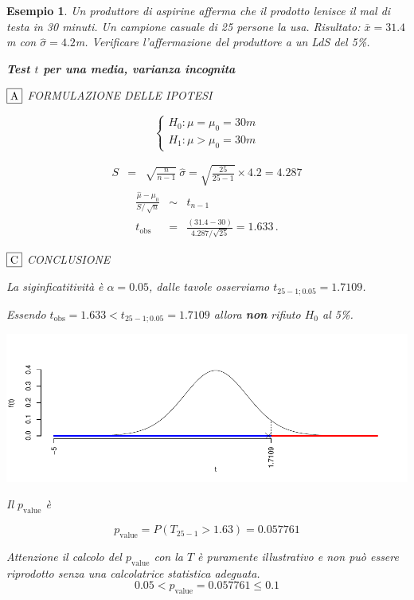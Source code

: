 \documentclass[
  11pt,
]{book}
\theoremstyle{mytheoremstyle}
\theoremstyle{mydefstyle}
\newtheorem{example}{{Esempio}}[section]
\begin{document}
\begin{example}
Un produttore di aspirine afferma che il prodotto lenisce il mal di
testa in 30 minuti. Un campione casuale di 25 persone la usa. Risultato:
\(\bar{x}=31.4\)m con \(\hat{\sigma}= 4.2\)m. Verificare l'affermazione del
produttore a un LdS del 5\%.

\textbf{Test \(t\) per una media, varianza incognita}

\(\fbox{A}\) FORMULAZIONE DELLE IPOTESI

\[\begin{cases}
   H_0: \mu = \mu_0=30m \\
   H_1: \mu > \mu_0=30m 
   \end{cases}\]

\begin{eqnarray*}
   S    &=& \sqrt{\frac{n} {n-1}}\ \widehat{\sigma} 
   =  \sqrt{\frac{ 25 } { 25 -1}} \times  4.2  =  4.287 
   \end{eqnarray*}
\begin{eqnarray*}
   \frac{\hat\mu - \mu_{0}} {S/\,\sqrt{n}}&\sim&t_{n-1}\\
   t_{\text{obs}}
   &=& \frac{ ( 31.4 -  30 )} { 4.287 /\sqrt{ 25 }}
   =   1.633 \, .
   \end{eqnarray*}

\(\fbox{C}\) CONCLUSIONE

La siginficatitività è \(\alpha=0.05\), dalle tavole osserviamo \(t_{25-1;0.05}=1.7109\).

Essendo \(t_\text{obs}=1.633<t_{25-1;0.05}=1.7109\) allora \textbf{non} rifiuto \(H_0\) al 5\%.

\begin{center}\includegraphics{Appunti_di_Statistica_2025_files/figure-latex/15-test-mu-pi-5-1} \end{center}

Il \(p_{\text{value}}\) è

\[ p_{\text{value}} = P(T_{25-1}>1.63)=0.057761 \]

Attenzione il calcolo del \(p_\text{value}\) con la \(T\) è puramente illustrativo e non può essere riprodotto senza una calcolatrice statistica adeguata.\[
 0.05 < p_\text{value}= 0.057761 \leq 0.1 
\]
\end{example}
\end{document}
